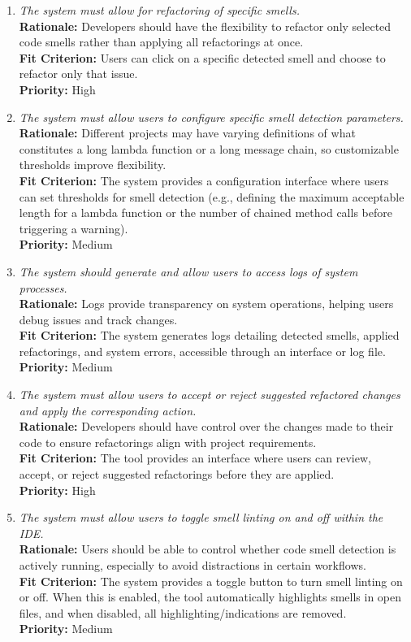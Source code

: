 \documentclass[12pt]{article}
\begin{document}
\begin{enumerate}[label=FR \arabic*., wide=0pt, leftmargin=*]
\item \emph{The system must allow for refactoring of specific smells.}\\[2mm]
    {\bf Rationale:} Developers should have the flexibility to refactor only selected code smells rather than applying all refactorings at once.\\
    {\bf Fit Criterion:} Users can click on a specific detected smell and choose to refactor only that issue.\\
    {\bf Priority:} High

\item \emph{The system must allow users to configure specific smell detection parameters.}\\[2mm]
    {\bf Rationale:} Different projects may have varying definitions of what constitutes a long lambda function or a long message chain, so customizable thresholds improve flexibility.\\
    {\bf Fit Criterion:} The system provides a configuration interface where users can set thresholds for smell detection (e.g., defining the maximum acceptable length for a lambda function or the number of chained method calls before triggering a warning).\\
    {\bf Priority:} Medium

\item \emph{The system should generate and allow users to access logs of system processes.}\\[2mm]
    {\bf Rationale:} Logs provide transparency on system operations, helping users debug issues and track changes.\\
    {\bf Fit Criterion:} The system generates logs detailing detected smells, applied refactorings, and system errors, accessible through an interface or log file.\\
    {\bf Priority:} Medium

\item \emph{The system must allow users to accept or reject suggested refactored changes and apply the corresponding action.}\\[2mm]
    {\bf Rationale:} Developers should have control over the changes made to their code to ensure refactorings align with project requirements.\\
    {\bf Fit Criterion:} The tool provides an interface where users can review, accept, or reject suggested refactorings before they are applied.\\
    {\bf Priority:} High

\item \emph{The system must allow users to toggle smell linting on and off within the IDE.}\\[2mm]
    {\bf Rationale:} Users should be able to control whether code smell detection is actively running, especially to avoid distractions in certain workflows.\\
    {\bf Fit Criterion:} The system provides a toggle button to turn smell linting on or off. When this is enabled, the tool automatically highlights smells in open files, and when disabled, all highlighting/indications are removed.\\
    {\bf Priority:} Medium


\end{enumerate}
\end{document}

